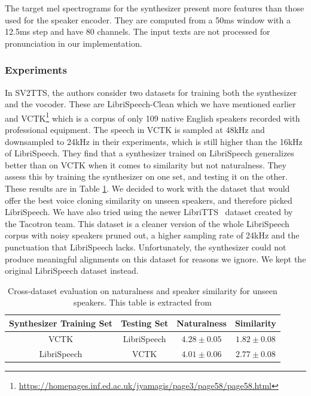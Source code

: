 \documentclass[a4paper, oneside, 12pt, english]{article}
\begin{document}
The target mel spectrograms for the synthesizer present more features than those used for the speaker encoder. They are computed from a 50ms window with a 12.5ms step and have 80 channels. The input texts are not processed for pronunciation in our implementation.

\subsubsection{Experiments}
In SV2TTS, the authors consider two datasets for training both the synthesizer and the vocoder. These are LibriSpeech-Clean which we have mentioned earlier and VCTK\footnote{\url{https://homepages.inf.ed.ac.uk/jyamagis/page3/page58/page58.html}} which is a corpus of only 109 native English speakers recorded with professional equipment. The speech in VCTK is sampled at 48kHz and downsampled to 24kHz in their experiments, which is still higher than the 16kHz of LibriSpeech. They find that a synthesizer trained on LibriSpeech generalizes better than on VCTK when it comes to similarity but not naturalness. They assess this by training the synthesizer on one set, and testing it on the other. These results are in Table \ref{libri_vctk_cross}. We decided to work with the dataset that would offer the best voice cloning similarity on unseen speakers, and therefore picked LibriSpeech. We have also tried using the newer LibriTTS~\citep{LibriTTS} dataset created by the Tacotron team. This dataset is a cleaner version of the whole LibriSpeech corpus with noisy speakers pruned out, a higher sampling rate of 24kHz and the punctuation that LibriSpeech lacks. Unfortunately, the synthesizer could not produce meaningful alignments on this dataset for reasons we ignore. We kept the original LibriSpeech dataset instead.

\begin{table}[h]
	\begin{center}
		\begin{small}
			\begin{tabular}{cccc}
				\toprule
				Synthesizer Training Set & Testing Set & Naturalness & Similarity \\
				\midrule
				VCTK & LibriSpeech & $4.28 \pm 0.05$ & $1.82 \pm 0.08$ \\
				LibriSpeech & VCTK & $4.01 \pm 0.06$ & $2.77 \pm 0.08$ \\
				\bottomrule
			\end{tabular}
		\end{small}
	\end{center}
	\caption{Cross-dataset evaluation on naturalness and speaker similarity for unseen speakers. This table is extracted from \citep{SV2TTS}}
	\label{libri_vctk_cross}
\end{table}
\end{document}
